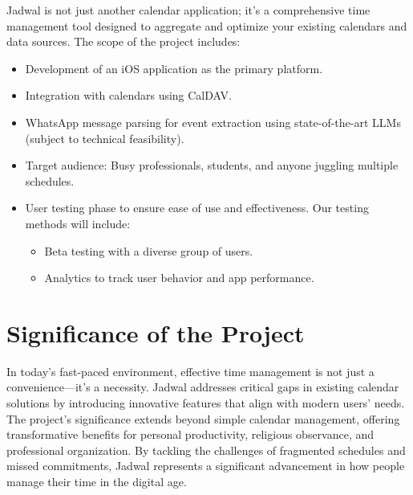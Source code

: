 Jadwal is not just another calendar application; it's a comprehensive time management tool designed to aggregate and optimize your existing calendars and data sources. The scope of the project includes:
\begin{itemize}
    \item Development of an iOS application as the primary platform.
    \item Integration with calendars using CalDAV.
    \item WhatsApp message parsing for event extraction using state-of-the-art LLMs (subject to technical feasibility).
    \item Target audience: Busy professionals, students, and anyone juggling multiple schedules.
    \item User testing phase to ensure ease of use and effectiveness. Our testing methods will include:
          \begin{itemize}
              \item Beta testing with a diverse group of users.
              \item Analytics to track user behavior and app performance.
          \end{itemize}
\end{itemize}


\section{Significance of the Project}

In today's fast-paced environment, effective time management is not just a convenience—it's a necessity. Jadwal addresses critical gaps in existing calendar solutions by introducing innovative features that align with modern users' needs. The project's significance extends beyond simple calendar management, offering transformative benefits for personal productivity, religious observance, and professional organization. By tackling the challenges of fragmented schedules and missed commitments, Jadwal represents a significant advancement in how people manage their time in the digital age.

